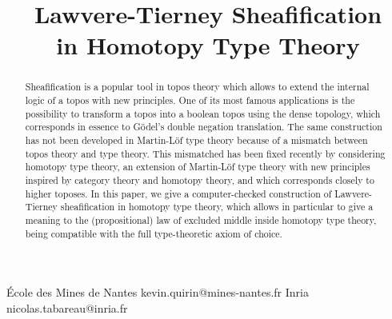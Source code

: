 \documentclass[preprint,9pt,numbers]{sigplanconf}
\begin{document}
\setlength{\pdfpageheight}{\paperheight}
\setlength{\pdfpagewidth}{\paperwidth}




\title{Lawvere-Tierney Sheafification\\ in Homotopy Type Theory}

           {\'Ecole des Mines de Nantes}
           {kevin.quirin@mines-nantes.fr}
           {Inria}
           {nicolas.tabareau@inria.fr}

\maketitle

\begin{abstract}
  Sheafification is a popular tool in topos theory which
  allows to extend the internal logic of a topos with new
  principles. One of its most famous applications is the possibility
  to transform a topos into a boolean topos using the
  dense topology, which corresponds in essence to Gödel's double
  negation translation.
  The same construction has not been developed in Martin-Löf type
  theory because of a mismatch between topos theory and type theory. This
  mismatched has been fixed recently by considering homotopy type
  theory, an extension of Martin-Löf type theory with new
  principles inspired by category theory and homotopy theory, and
  which corresponds closely to higher toposes.
  In this paper, we give a computer-checked construction of
  Lawvere-Tierney sheafification in homotopy type theory, which allows
  in particular to give a meaning to the (propositional) law of
  excluded middle inside homotopy type theory, being
  compatible with the full type-theoretic axiom of choice.
\end{abstract}

\end{document}
